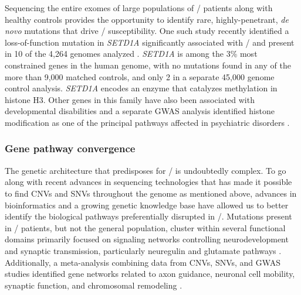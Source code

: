 Sequencing the entire exomes of large populations of \scz/ patients along with healthy controls provides the opportunity to identify rare, highly-penetrant, \emph{de novo} mutations that drive \scz/ susceptibility. One such study recently identified a loss-of-function mutation in \emph{SETD1A} significantly associated with \scz/ and present in 10 of the 4,264 genomes analyzed \citep{Singh2016}.
\emph{SETD1A} is among the 3\% most constrained genes in the human genome, with no mutations found in any of the more than 9,000 matched controls, and only 2 in a separate 45,000 genome control analysis.
\emph{SETD1A} encodes an enzyme that catalyzes methylation in histone H3. Other genes in this family have also been associated with developmental disabilities and a separate GWAS analysis identified histone modification as one of the principal pathways affected in psychiatric disorders \citep{ODushlaine2015}.

\subsubsection{Gene pathway convergence}
The genetic architecture that predisposes for \scz/ is undoubtedly complex.
To go along with recent advances in sequencing technologies that has made it possible to find CNVs and SNVs throughout the genome as mentioned above, advances in bioinformatics and a growing genetic knowledge base have allowed us to better identify the biological pathways preferentially disrupted in \scz/.
Mutations present in \scz/ patients, but not the general population, cluster within several functional domains primarily focused on signaling networks controlling neurodevelopment and synaptic transmission, particularly neuregulin and glutamate pathways \citep[\autoref{table:intro:scz:pathways},][]{Walsh2008, Glessner2010}.
Additionally, a meta-analysis combining data from \ac{CNVs}, \ac{SNVs}, and GWAS studies identified gene networks related to axon guidance, neuronal cell mobility, synaptic function, and chromosomal remodeling \citep[\autoref{fig:intro:scz:cluster},][]{Gilman2012}.

